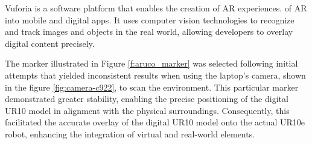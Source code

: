     Vuforia is a software platform that enables the creation of \ac{AR} experiences. 
    of AR into mobile and digital apps. 
    It uses computer vision technologies to recognize and track images and objects in the real world, allowing developers to overlay digital 
    content precisely.

    The marker illustrated in Figure \ref{f:aruco_marker} was selected following initial attempts that yielded inconsistent results when using 
    the laptop's camera, shown in the figure \ref{fig:camera-c922}, to scan the environment. This particular marker demonstrated greater stability, 
    enabling the precise positioning of the digital UR10 model in alignment with the physical surroundings. Consequently, this facilitated the accurate 
    overlay of the digital UR10 model onto the actual UR10e robot, enhancing the integration of virtual and real-world elements.

